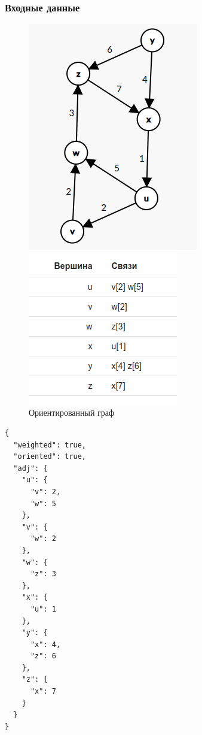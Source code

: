 \subsubsection{Входные данные}
\begin{figure}[H]
  \begin{minipage}{0.5\textwidth}
    \centering\includegraphics[width=0.6\linewidth]{figs/task-3/graph-2.png}
  \end{minipage}
  \begin{minipage}{0.5\textwidth}
    \centering\includegraphics[width=0.6\linewidth]{figs/task-3/adj-2.png}
  \end{minipage}
  \caption{Ориентированный граф}
\end{figure}

\begin{verbatim}
{
  "weighted": true,
  "oriented": true,
  "adj": {
    "u": {
      "v": 2,
      "w": 5
    },
    "v": {
      "w": 2
    },
    "w": {
      "z": 3
    },
    "x": {
      "u": 1
    },
    "y": {
      "x": 4,
      "z": 6
    },
    "z": {
      "x": 7
    }
  }
}
\end{verbatim}

